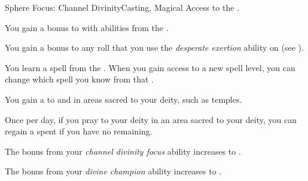     \begin{feat}{Sphere Focus: Channel Divinity}{Casting, Magical}
        \featpre Access to the  .

         You gain a  bonus to  with abilities from the  .

         You gain a  bonus to any roll that you use the \textit{desperate exertion} ability on (see ).

         You learn a spell from the  .
        When you gain access to a new spell level, you can change which spell you know from that .

         You gain a   to  and  in areas sacred to your deity, such as temples.

         Once per day, if you pray to your deity in an area sacred to your deity, you can regain a spent  if you have no  remaining.

         The bonus from your \textit{channel divinity focus} ability increases to .

         The bonus from your \textit{divine champion} ability increases to .
    \end{feat}

